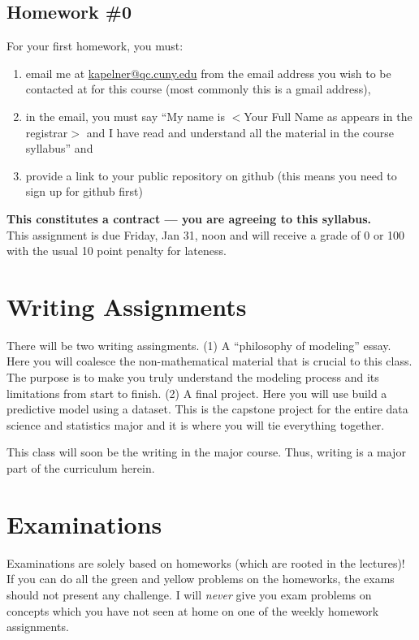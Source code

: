 \documentclass[12pt]{article}
\newcommand{\inred}[1]{\color{red}\textbf{#1} \color{black}}
\newcommand{\qu}[1]{``#1''}
\begin{document}
\subsection*{Homework \#0}

For your first homework, you must:

\begin{enumerate}[(1)]
\item email me at \href{kapelner@qc.cuny.edu}{kapelner@qc.cuny.edu} from the email address you wish to be contacted at for this course (most commonly this is a gmail address),
\item in the email, you must say \qu{My name is $<$Your Full Name as appears in the registrar$>$ and I have read and understand all the material in the course syllabus} and
\item provide a link to your public repository on github (this means you need to sign up for github first)
\end{enumerate}

\noindent \inred{This constitutes a contract --- you are agreeing to this syllabus.} \\

This assignment is due Friday, Jan 31, noon and will receive a grade of 0 or 100 with the usual 10 point penalty for lateness.

\section*{Writing Assignments}

There will be two writing assingments. (1) A \qu{philosophy of modeling} essay. Here you will coalesce the non-mathematical material that is crucial to this class. The purpose is to make you truly understand the modeling process and its limitations from start to finish. (2) A final project. Here you will use build a predictive model using a dataset. This is the capstone project for the entire data science and statistics major and it is where you will tie everything together.

This class will soon be the writing in the major course. Thus, writing is a major part of the curriculum herein.

\section*{Examinations}

Examinations are solely based on homeworks (which are rooted in the lectures)! If you can do all the green and yellow problems on the homeworks, the exams should not present any challenge. I will \textit{never} give you exam problems on concepts which you have not seen at home on one of the weekly homework assignments. 
\end{document}
